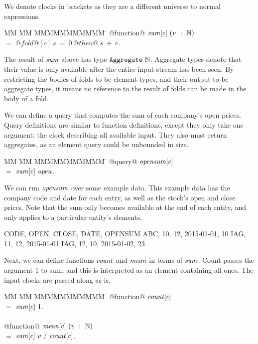 We denote clocks in brackets as they are a different universe to normal expressions.
\begin{tabbing}
MM \= MM \= MMMMMMMMMMM \= \kill
@function@ 
$\mathit{sum}[c]~(v~:~\mathbb{N})$    \\
\> $=$  \> $@fold@[c]~s~=~0~@then@~s~+~v$. \\
\end{tabbing}

The result of $\mathit{sum}$ above has type $\mathtt{Aggregate}~\mathbb{N}$.
Aggregate types denote that their value is only available after the entire input stream has been seen.
By restricting the bodies of folds to be element types, and their output to be aggregate types, it means no reference to the result of folds can be made in the body of a fold.

We can define a query that computes the sum of each company's open prices.
Query definitions are similar to function definitions, except they only take one argument: the clock describing all available input.
They also must return aggregates, as an element query could be unbounded in size.
\begin{tabbing}
MM \= MM \= MMMMMMMMMMM \= \kill
@query@ 
$\mathit{opensum}[c]$    \\
\> $=$  \> $\mathit{sum}[c]~\mathit{open}$. \\
\end{tabbing}

We can run $\mathit{opensum}$ over some example data.
This example data has the company code and date for each entry, as well as the stock's open and close prices.
Note that the sum only becomes available at the end of each entity, and only applies to a particular entity's elements.

\begin{code}
CODE, OPEN, CLOSE, DATE,        OPENSUM
ABC,    10,    12, 2015-01-01,       10
IAG,    11,    12, 2015-01-01
IAG,    12,    10, 2015-01-02,       23
\end{code}


Next, we can define functions $\mathit{count}$ and $\mathit{mean}$ in terms of $\mathit{sum}$.
Count passes the argument $1$ to sum, and this is interpreted as an element containing all ones.
The input clocks are passed along as-is.
\begin{tabbing}
MM \= MM \= MMMMMMMMMMM \= \kill
@function@ 
$\mathit{count}[c]$                                     \\
 \> $=$  \> $\mathit{sum}[c]~1$.                           \\
                                                    \\
@function@ 
$\mathit{mean}[c]~(v~:~\mathbb{N})$                                       \\
 \> $=$  \> $\mathit{sum}[c]~v~/~\mathit{count}[c]$.              \\
\end{tabbing}

